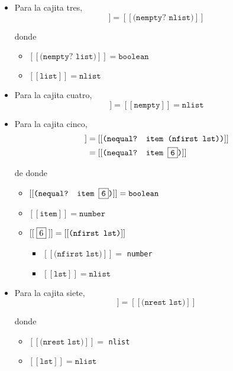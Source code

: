 \documentclass[letterpaper,11pt]{article}
\begin{document}
\begin{enumerate}
\begin{itemize}
        \item Para la cajita tres, 
        \begin{equation*}
            [[\;\fbox{3}\;]] = [[\texttt{(nempty? nlist)}]]
        \end{equation*}

        donde 
        \begin{itemize}
            \item $[[\texttt{(nempty? list)}]] = \texttt{boolean}$
            \item $[[\texttt{list}]] = \texttt{nlist}$
        \end{itemize}

        \item Para la cajita cuatro, 
        \begin{equation*}
            [[\;\fbox{4}\;]] = [[\texttt{nempty}]] = \texttt{nlist}
        \end{equation*}

        \item Para la cajita cinco,
        \begin{align*}
            [[\;\fbox{5}\;]]
            &= [[\texttt{(nequal? item (nfirst lst))}]] \\ 
            &= [[\texttt{(nequal? item \fbox{6})}]] 
        \end{align*}

        de donde 
        \begin{itemize}
            \item $[[\texttt{(nequal? item \fbox{6})}]] = \texttt{boolean}$
            \item $[[\texttt{item}]] = \texttt{number}$
            \item $[[\;\fbox{6}\;]] = [[\texttt{(nfirst lst)}]]$
            \begin{itemize}
                \item $[[\texttt{(nfirst lst)}]] =$ \texttt{number}
                \item $[[\texttt{lst}]] = \texttt{nlist}$
            \end{itemize}
        \end{itemize}

        \item Para la cajita siete, 
        \begin{equation*}
            [[\;\fbox{7}\;]] = [[\texttt{(nrest lst)}]]
        \end{equation*}

        donde 
        \begin{itemize}
            \item $[[\texttt{(nrest lst)}]] =$ \texttt{nlist}
            \item $[[\texttt{lst}]] = \texttt{nlist}$
        \end{itemize}


\end{itemize}
\end{enumerate}
\end{document}
